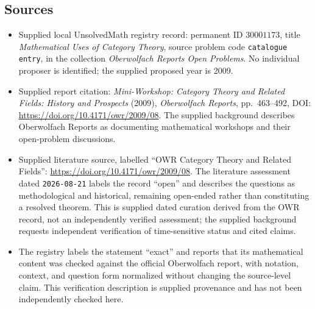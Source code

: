 \documentclass[11pt]{article}
\begin{document}
\subsection{Sources}
\begin{itemize}
\item Supplied local UnsolvedMath registry record: permanent ID \(30001173\), title \emph{Mathematical Uses of Category Theory}, source problem code \texttt{catalogue entry}, in the collection \emph{Oberwolfach Reports Open Problems}. No individual proposer is identified; the supplied proposed year is 2009.
\item Supplied report citation: \emph{Mini-Workshop: Category Theory and Related Fields: History and Prospects} (2009), \emph{Oberwolfach Reports}, pp.~463--492, DOI: \url{https://doi.org/10.4171/owr/2009/08}. The supplied background describes Oberwolfach Reports as documenting mathematical workshops and their open-problem discussions.
\item Supplied literature source, labelled ``OWR Category Theory and Related Fields'': \url{https://doi.org/10.4171/owr/2009/08}. The literature assessment dated \texttt{2026-08-21} labels the record ``open'' and describes the questions as methodological and historical, remaining open-ended rather than constituting a resolved theorem. This is supplied dated curation derived from the OWR record, not an independently verified assessment; the supplied background requests independent verification of time-sensitive status and cited claims.
\item The registry labels the statement ``exact'' and reports that its mathematical content was checked against the official Oberwolfach report, with notation, context, and question form normalized without changing the source-level claim. This verification description is supplied provenance and has not been independently checked here.
\end{itemize}
\end{document}
